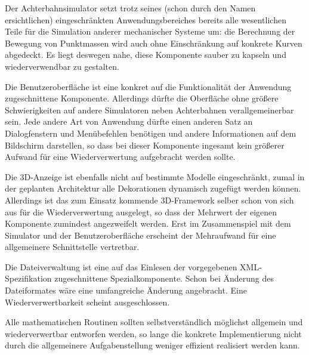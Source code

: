 Der Achterbahnsimulator setzt trotz seines (schon durch den Namen ersichtlichen)
eingeschränkten Anwendungsbereiches bereits alle wesentlichen Teile für die
Simulation anderer mechanischer Systeme um: die Berechnung der Bewegung von
Punktmassen wird auch ohne Einschränkung auf konkrete Kurven abgedeckt. Es liegt
deswegen nahe, diese Komponente sauber zu kapseln und wiederverwendbar zu gestalten.

Die Benutzeroberfläche ist eine konkret auf die Funktionalität der Anwendung
zugeschnittene Komponente. Allerdings dürfte die Oberfläche ohne größere
Schwierigkeiten auf andere Simulatoren neben Achterbahnen verallgemeinerbar sein.
Jede andere Art von Anwendung dürfte einen anderen Satz an Dialogfenstern und
Menübefehlen benötigen und andere Informationen auf dem Bildschirm darstellen,
so dass bei dieser Komponente ingesamt kein größerer Aufwand für eine
Wiederverwertung aufgebracht werden sollte.

Die 3D-Anzeige ist ebenfalls nicht auf bestimmte Modelle eingeschränkt, zumal in
der geplanten Architektur alle Dekorationen dynamisch zugefügt werden können.
Allerdings ist das zum Einsatz kommende 3D-Framework selber schon von sich aus 
für die Wiederverwertung ausgelegt, so dass der Mehrwert der eigenen Komponente
zumindest angezweifelt werden. Erst im Zusammenspiel mit dem Simulator und der 
Benutzeroberfläche erscheint der Mehraufwand für eine allgemeinere Schnittstelle
vertretbar.

Die Dateiverwaltung ist eine auf das Einlesen der vorgegebenen XML-Spezifikation 
zugeschnittene Spezialkomponente. Schon bei Änderung des Dateiformates wäre eine
umfangreiche Änderung angebracht. Eine Wiederverwertbarkeit scheint ausgeschlossen.

Alle mathematischen Routinen sollten selbstverständlich möglichst allgemein und
wiederverwertbar entworfen werden, so lange die konkrete Implementierung nicht
durch die allgemeinere Aufgabenstellung weniger effizient realisiert werden kann.
